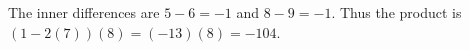 The inner differences are $5-6=-1$ and $8-9=-1$. Thus the product is $(1-2(7))(8)=(-13)(8)=\boxed{-104}$.
